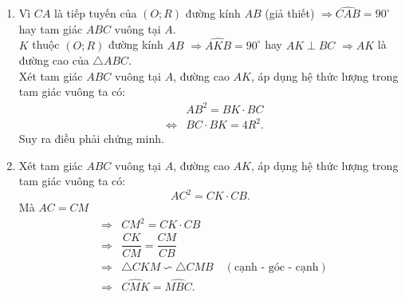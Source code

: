 \begin{bt}
{\begin{enumerate}
			Mặt khác, tam giác $AMB$ có $OM$ là đường trung tuyến và $OM=\dfrac{1}{2}AB$ nên $\triangle AMB$ vuông tại $M$ $\Rightarrow BM\perp AM$. \hfill (2)\\
			Từ (1) và (2) suy ra $MB\parallel OC$.
			\item Vì $CA$ là tiếp tuyến của $\left( {O;R} \right)$ đường kính $AB$ (giả thiết) $\Rightarrow \widehat {CAB}=90^\circ$ hay tam giác $ABC$ vuông tại $A$. \\
			$K$ thuộc $\left( {O;R} \right)$ đường kính $AB$ $\Rightarrow \widehat {AKB}=90^\circ$ hay $AK \perp BC$ $\Rightarrow AK$ là đường cao của $\triangle ABC$. \\
			Xét tam giác $ABC$ vuông tại $A$, đường cao $AK$, áp dụng hệ thức lượng trong tam giác vuông ta có:
			\begin{eqnarray*}
				& & AB^2=BK\cdot BC \\
				& \Leftrightarrow & BC\cdot BK=4R^2.
			\end{eqnarray*}
			Suy ra điều phải chứng minh.
			\item Xét tam giác $ABC$ vuông tại $A$, đường cao $AK$, áp dụng hệ thức lượng trong tam giác vuông ta có:
			\[AC^2=CK\cdot CB.\]
			Mà $AC=CM$ 
			\begin{eqnarray*}
				& \Rightarrow & CM^2=CK\cdot CB\\
				& \Rightarrow & \dfrac{CK}{CM}=\dfrac{CM}{CB} \\
				& \Rightarrow & \triangle CKM \backsim \triangle CMB \quad (\text{cạnh - góc - cạnh})\\
				& \Rightarrow & \widehat {CMK}=\widehat {MBC}.
			\end{eqnarray*}
		\end{enumerate}	
	}
\end{bt}

